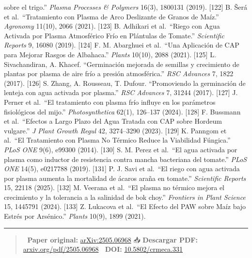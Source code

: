 \documentclass[
  11pt,
  letterpaper,
]{article}
\begin{document}
sobre el trigo.'' \emph{Plasma Processes \& Polymers} 16(3), 1800131
(2019). {[}122{]} B. Šerá et al.~``Tratamiento con Plasma de Arco
Deslizante de Granos de Maíz.'' \emph{Agronomy} 11(10), 2066 (2021).
{[}123{]} B. Adhikari et al.~``Riego con Agua Activada por Plasma
Atmosférico Frío en Plántulas de Tomate.'' \emph{Scientific Reports} 9,
16080 (2019). {[}124{]} F. M. Abarghuei et al.~``Una Aplicación de CAP
para Mejorar Rasgos de Albahaca.'' \emph{Plants} 10(10), 2088 (2021).
{[}125{]} L. Sivachandiran, A. Khacef. ``Germinación mejorada de
semillas y crecimiento de plantas por plasma de aire frío a presión
atmosférica.'' \emph{RSC Advances} 7, 1822 (2017). {[}126{]} S. Zhang,
A. Rousseau, T. Dufour. ``Promoviendo la germinación de lenteja con agua
activada por plasma.'' \emph{RSC Advances} 7, 31244 (2017). {[}127{]} J.
Perner et al.~``El tratamiento con plasma frío influye en los parámetros
fisiológicos del mijo.'' \emph{Photosynthetica} 62(1), 126--137 (2024).
{[}128{]} F. Bussmann et al.~``Efectos a Largo Plazo del Agua Tratada
con CAP sobre Hordeum vulgare.'' \emph{J Plant Growth Regul} 42,
3274--3290 (2023). {[}129{]} K. Panngom et al.~``El Tratamiento con
Plasma No Térmico Reduce la Viabilidad Fúngica.'' \emph{PLoS ONE} 9(6),
e99300 (2014). {[}130{]} S. M. Perez et al.~``El agua activada por
plasma como inductor de resistencia contra mancha bacteriana del
tomate.'' \emph{PLoS ONE} 14(5), e0217788 (2019). {[}131{]} P. J. Savi
et al.~``El riego con agua activada por plasma aumenta la mortalidad de
ácaros araña en tomate.'' \emph{Scientific Reports} 15, 22118 (2025).
{[}132{]} M. Veerana et al.~``El plasma no térmico mejora el crecimiento
y la tolerancia a la salinidad de bok choy.'' \emph{Frontiers in Plant
Science} 15, 1445791 (2024). {[}133{]} Z. Lukacova et al.~``El Efecto
del PAW sobre Maíz bajo Estrés por Arsénico.'' \emph{Plants} 10(9), 1899
(2021).

\begin{center}\rule{0.5\linewidth}{0.5pt}\end{center}

\begin{quote}
📄 \textbf{Paper original:}
\href{https://arxiv.org/abs/2505.06968}{arXiv:2505.06968} 📥
\textbf{Descargar PDF:}
\href{https://arxiv.org/pdf/2505.06968}{arxiv.org/pdf/2505.06968} 🔬
\textbf{DOI:}
\href{https://doi.org/10.5802/crmeca.331}{10.5802/crmeca.331}
\end{quote}
\end{document}
